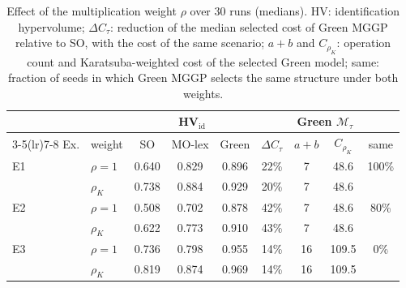 \begin{table}[!htbp]
\centering
\caption{Effect of the multiplication weight $\rho$ over 30 runs (medians). HV: identification hypervolume; $\Delta C_\tau$: reduction of the median selected cost of Green MGGP relative to SO, with the cost of the same scenario; $a{+}b$ and $C_{\rho_K}$: operation count and Karatsuba-weighted cost of the selected Green model; same: fraction of seeds in which Green MGGP selects the same structure under both weights.}
\label{tab:rho}
\setlength{\tabcolsep}{3.5pt}
\small
\begin{tabular}{llccccccc}
\toprule
 & & \multicolumn{3}{c}{HV$_\mathrm{id}$} & & \multicolumn{2}{c}{Green $\mathcal M_\tau$} & \\
\cmidrule(lr){3-5}\cmidrule(lr){7-8}
Ex. & weight & SO & MO-lex & Green & $\Delta C_\tau$ & $a{+}b$ & $C_{\rho_K}$ & same \\
\midrule
E1 & $\rho=1$ & 0.640 & 0.829 & 0.896 & 22\% & 7 & 48.6 & 100\% \\
 & $\rho_K$ & 0.738 & 0.884 & 0.929 & 20\% & 7 & 48.6 &  \\
\midrule
E2 & $\rho=1$ & 0.508 & 0.702 & 0.878 & 42\% & 7 & 48.6 & 80\% \\
 & $\rho_K$ & 0.622 & 0.773 & 0.910 & 43\% & 7 & 48.6 &  \\
\midrule
E3 & $\rho=1$ & 0.736 & 0.798 & 0.955 & 14\% & 16 & 109.5 & 0\% \\
 & $\rho_K$ & 0.819 & 0.874 & 0.969 & 14\% & 16 & 109.5 &  \\
\bottomrule
\end{tabular}
\end{table}
